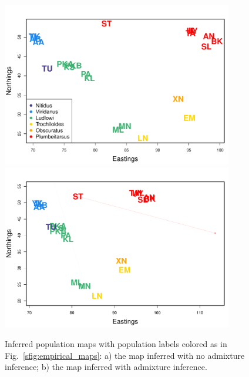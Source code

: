 \documentclass[10pt,letterpaper]{article}
\begin{document}
\begin{figure}
	\centering
			{\includegraphics[width=0.9\textwidth,height=0.75\textwidth]{../figs/warblers/warb_pop_noad.pdf}}
			{\includegraphics[width=0.9\textwidth,height=0.75\textwidth]{../figs/warblers/population_warbler_ad_map_randpr1.pdf}}
\caption{Inferred population maps with population labels colored as in Fig.\ \ref{sfig:empirical_maps}: a) the map inferred with no admixture inference; b) the map inferred with admixture inference.}
\label{sfig:warbler_pop}
\end{figure}
\end{document}
